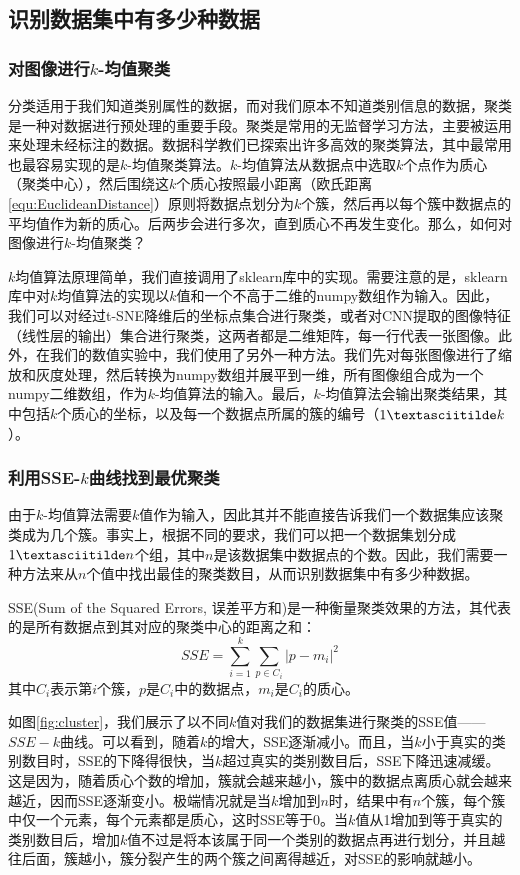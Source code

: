 \subsection{识别数据集中有多少种数据}
\subsubsection{对图像进行$k$-均值聚类}
分类适用于我们知道类别属性的数据，而对我们原本不知道类别信息的数据，聚类是一种对数据进行预处理的重要手段。聚类是常用的无监督学习方法，主要被运用来处理未经标注的数据。数据科学教们已探索出许多高效的聚类算法，其中最常用也最容易实现的是$k$-均值聚类算法\cite{DL, 机器学习实战}。$k$-均值算法从数据点中选取$k$个点作为质心（聚类中心），然后围绕这$k$个质心按照最小距离（欧氏距离\ref{equ:EuclideanDistance}）原则将数据点划分为$k$个簇，然后再以每个簇中数据点的平均值作为新的质心。后两步会进行多次，直到质心不再发生变化。那么，如何对图像进行$k$-均值聚类？

$k$均值算法原理简单，我们直接调用了sklearn库\cite{sklearn}中的实现。需要注意的是，sklearn库中对$k$均值算法的实现以$k$值和一个不高于二维的numpy\cite{numpy}数组作为输入。因此，我们可以对经过t-SNE降维后的坐标点集合进行聚类，或者对CNN提取的图像特征（线性层的输出）集合进行聚类，这两者都是二维矩阵，每一行代表一张图像。此外，在我们的数值实验中，我们使用了另外一种方法。我们先对每张图像进行了缩放和灰度处理，然后转换为numpy数组并展平到一维，所有图像组合成为一个numpy二维数组，作为$k$-均值算法的输入。最后，$k$-均值算法会输出聚类结果，其中包括$k$个质心的坐标，以及每一个数据点所属的簇的编号（$1\textasciitilde k$）。

\subsubsection{利用SSE-$k$曲线找到最优聚类}
由于$k$-均值算法需要$k$值作为输入，因此其并不能直接告诉我们一个数据集应该聚类成为几个簇。事实上，根据不同的要求，我们可以把一个数据集划分成$1\textasciitilde n$个组，其中$n$是该数据集中数据点的个数。因此，我们需要一种方法来从$n$个值中找出最佳的聚类数目，从而识别数据集中有多少种数据。

SSE(Sum of the Squared Errors, 误差平方和)是一种衡量聚类效果的方法\cite{机器学习实战}，其代表的是所有数据点到其对应的聚类中心的距离之和：
\begin{equation}\label{equ:sse}
SSE = \sum_{i=1}^{k}\sum_{p\in C_i}|p-m_i|^2
\end{equation}
其中$C_i$表示第$i$个簇，$p$是$C_i$中的数据点，$m_i$是$C_i$的质心。

如图\ref{fig:cluster}，我们展示了以不同$k$值对我们的数据集进行聚类的SSE值——$SSE-k$曲线。可以看到，随着$k$的增大，SSE逐渐减小。而且，当$k$小于真实的类别数目时，SSE的下降得很快，当$k$超过真实的类别数目后，SSE下降迅速减缓。这是因为，随着质心个数的增加，簇就会越来越小，簇中的数据点离质心就会越来越近，因而SSE逐渐变小。极端情况就是当$k$增加到$n$时，结果中有$n$个簇，每个簇中仅一个元素，每个元素都是质心，这时SSE等于0。当$k$值从1增加到等于真实的类别数目后，增加$k$值不过是将本该属于同一个类别的数据点再进行划分，并且越往后面，簇越小，簇分裂产生的两个簇之间离得越近，对SSE的影响就越小。

